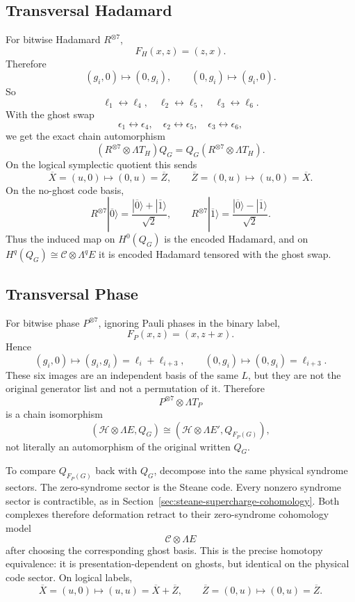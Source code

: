 \subsection{Transversal Hadamard}

For bitwise Hadamard \(R^{\otimes7}\),
\[
  F_H(x,z)=(z,x).
\]
Therefore
\[
  (g_i,0)\mapsto(0,g_i),\qquad
  (0,g_i)\mapsto(g_i,0).
\]
So
\[
  \ell_1\leftrightarrow\ell_4,\quad
  \ell_2\leftrightarrow\ell_5,\quad
  \ell_3\leftrightarrow\ell_6.
\]
With the ghost swap
\[
  \epsilon_1\leftrightarrow\epsilon_4,\quad
  \epsilon_2\leftrightarrow\epsilon_5,\quad
  \epsilon_3\leftrightarrow\epsilon_6,
\]
we get the exact chain automorphism
\[
  (R^{\otimes7}\otimes\Lambda T_H)Q_G
  =
  Q_G(R^{\otimes7}\otimes\Lambda T_H).
\]
On the logical symplectic quotient this sends
\[
  \overline X=(u,0)\mapsto(0,u)=\overline Z,
  \qquad
  \overline Z=(0,u)\mapsto(u,0)=\overline X.
\]
On the no-ghost code basis,
\[
  R^{\otimes7}|\overline0\rangle
  =
  \frac{|\overline0\rangle+|\overline1\rangle}{\sqrt2},
  \qquad
  R^{\otimes7}|\overline1\rangle
  =
  \frac{|\overline0\rangle-|\overline1\rangle}{\sqrt2}.
\]
Thus the induced map on \(H^0(Q_G)\) is the encoded Hadamard, and on
\(H^q(Q_G)\cong\mathcal C\otimes\Lambda^qE\) it is encoded Hadamard tensored
with the ghost swap.

\subsection{Transversal Phase}

For bitwise phase \(P^{\otimes7}\), ignoring Pauli phases in the binary label,
\[
  F_P(x,z)=(x,z+x).
\]
Hence
\[
  (g_i,0)\mapsto(g_i,g_i)=\ell_i+\ell_{i+3},
  \qquad
  (0,g_i)\mapsto(0,g_i)=\ell_{i+3}.
\]
These six images are an independent basis of the same \(L\), but they are not
the original generator list and not a permutation of it. Therefore
\[
  P^{\otimes7}\otimes\Lambda T_P
\]
is a chain isomorphism
\[
  (\mathcal H\otimes\Lambda E,Q_G)
  \cong
  (\mathcal H\otimes\Lambda E',Q_{F_P(G)}),
\]
not literally an automorphism of the original written \(Q_G\).

To compare \(Q_{F_P(G)}\) back with \(Q_G\), decompose into the same physical
syndrome sectors. The zero-syndrome sector is the Steane code. Every nonzero
syndrome sector is contractible, as in Section~\ref{sec:steane-supercharge-cohomology}.
Both complexes therefore deformation retract to their zero-syndrome
cohomology model
\[
  \mathcal C\otimes\Lambda E
\]
after choosing the corresponding ghost basis. This is the precise homotopy
equivalence: it is presentation-dependent on ghosts, but identical on the
physical code sector. On logical labels,
\[
  \overline X=(u,0)\mapsto(u,u)=\overline X+\overline Z,
  \qquad
  \overline Z=(0,u)\mapsto(0,u)=\overline Z.
\]

